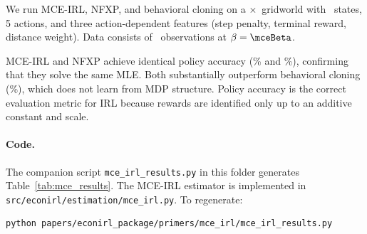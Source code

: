 \documentclass[10pt]{article}
\begin{document}


We run MCE-IRL, NFXP, and behavioral cloning on a \mceGridSize$\times$\mceGridSize\ gridworld with \mceNstates\ states, 5 actions, and three action-dependent features (step penalty, terminal reward, distance weight). Data consists of \mceNobs\ observations at $\beta = \mceBeta$.

MCE-IRL and NFXP achieve identical policy accuracy (\mcePolicyAcc\% and \mceNfxpPolicyAcc\%), confirming that they solve the same MLE. Both substantially outperform behavioral cloning (\mceBcPolicyAcc\%), which does not learn from MDP structure. Policy accuracy is the correct evaluation metric for IRL because rewards are identified only up to an additive constant and scale.

\paragraph{Code.}
The companion script \texttt{mce\_irl\_results.py} in this folder generates Table~\ref{tab:mce_results}. The MCE-IRL estimator is implemented in \texttt{src/econirl/estimation/mce\_irl.py}. To regenerate:
\begin{verbatim}
python papers/econirl_package/primers/mce_irl/mce_irl_results.py
\end{verbatim}




\end{document}
